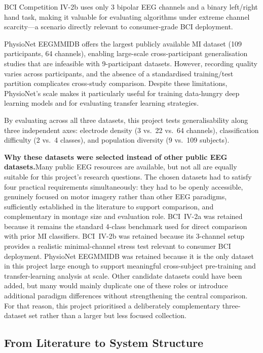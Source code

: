 \documentclass[12pt, a4paper]{article}
\begin{document}
BCI Competition IV-2b uses only 3 bipolar EEG channels and a binary left/right hand task, making it valuable for evaluating algorithms under extreme channel scarcity---a scenario directly relevant to consumer-grade BCI deployment.

PhysioNet EEGMMIDB offers the largest publicly available MI dataset (109 participants, 64 channels), enabling large-scale cross-participant generalisation studies that are infeasible with 9-participant datasets. However, recording quality varies across participants, and the absence of a standardised training/test partition complicates cross-study comparison. Despite these limitations, PhysioNet's scale makes it particularly useful for training data-hungry deep learning models and for evaluating transfer learning strategies.

By evaluating across all three datasets, this project tests generalisability along three independent axes: electrode density (3 vs.\ 22 vs.\ 64 channels), classification difficulty (2 vs.\ 4 classes), and population diversity (9 vs.\ 109 subjects).

\textbf{Why these datasets were selected instead of other public EEG datasets.}\quad Many public EEG resources are available, but not all are equally suitable for this project's research questions. The chosen datasets had to satisfy four practical requirements simultaneously: they had to be openly accessible, genuinely focused on motor imagery rather than other EEG paradigms, sufficiently established in the literature to support comparison, and complementary in montage size and evaluation role. BCI~IV-2a was retained because it remains the standard 4-class benchmark used for direct comparison with prior MI classifiers. BCI~IV-2b was retained because its 3-channel setup provides a realistic minimal-channel stress test relevant to consumer BCI deployment. PhysioNet EEGMMIDB was retained because it is the only dataset in this project large enough to support meaningful cross-subject pre-training and transfer-learning analysis at scale. Other candidate datasets could have been added, but many would mainly duplicate one of these roles or introduce additional paradigm differences without strengthening the central comparison. For that reason, this project prioritised a deliberately complementary three-dataset set rather than a larger but less focused collection.

\subsection{From Literature to System Structure}
\end{document}
